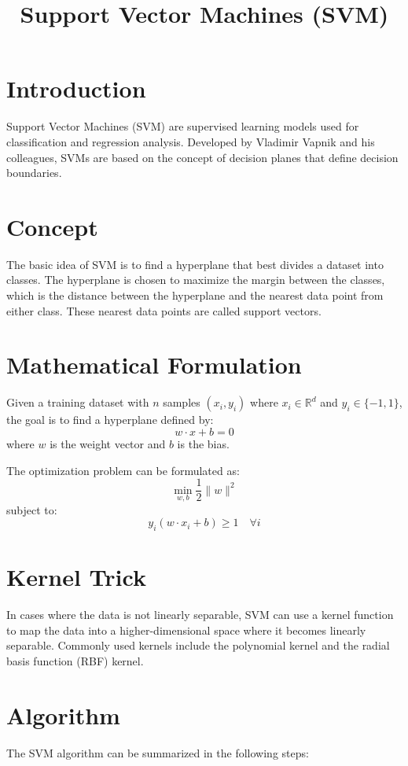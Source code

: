 \documentclass[12pt]{article}
\title{Support Vector Machines (SVM)}
\author{}
\date{}
\begin{document}
\maketitle

\section{Introduction}
Support Vector Machines (SVM) are supervised learning models used for classification and regression analysis. Developed by Vladimir Vapnik and his colleagues, SVMs are based on the concept of decision planes that define decision boundaries.

\section{Concept}
The basic idea of SVM is to find a hyperplane that best divides a dataset into classes. The hyperplane is chosen to maximize the margin between the classes, which is the distance between the hyperplane and the nearest data point from either class. These nearest data points are called support vectors.

\section{Mathematical Formulation}
Given a training dataset with $n$ samples $(x_i, y_i)$ where $x_i \in \mathbb{R}^d$ and $y_i \in \{-1, 1\}$, the goal is to find a hyperplane defined by:
\[
w \cdot x + b = 0
\]
where $w$ is the weight vector and $b$ is the bias.

The optimization problem can be formulated as:
\[
\min_{w, b} \frac{1}{2} \|w\|^2
\]
subject to:
\[
y_i (w \cdot x_i + b) \geq 1 \quad \forall i
\]

\section{Kernel Trick}
In cases where the data is not linearly separable, SVM can use a kernel function to map the data into a higher-dimensional space where it becomes linearly separable. Commonly used kernels include the polynomial kernel and the radial basis function (RBF) kernel.

\section{Algorithm}
The SVM algorithm can be summarized in the following steps:
\end{document}
